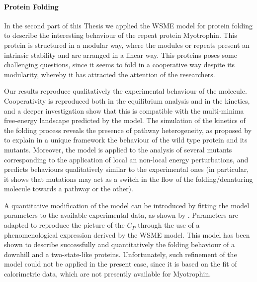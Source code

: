
\paragraph{Protein Folding}
In the second part of this Thesis we applied the WSME model for protein folding to describe the  interesting
behaviour of the repeat protein Myotrophin.
This protein is structured in a modular way, where the modules or repeats
present an intrinsic stability and are arranged in a linear way.
This proteins  poses some challenging questions, since it 
seems to fold in a cooperative way despite its modularity, whereby it has attracted the
attention of the researchers.

Our results reproduce qualitatively the experimental behaviour of the
molecule. Cooperativity is reproduced both in the equilibrium analysis and
in the kinetics, and a deeper investigation show that this is compatible with
the multi-minima free-energy landscape predicted by the model.
The simulation of the kinetics of the folding process reveals the presence of 
pathway heterogeneity, as proposed by \citet{Lowe2007a} to explain in a unique framework
the behaviour of the wild type protein and its mutants.
Moreover, the model is applied to the analysis  of several mutants corresponding to 
the application
of local an non-local energy perturbations, and predicts behaviours
qualitatively similar to the experimental ones (in particular, it shows that mutations may act as a switch in the flow of the folding/denaturing molecule towards a pathway or the other).

A quantitative modification of the model can be introduced by fitting the model
parameters to the available experimental data, as shown by
\citet{Bruscolini2011}.
Parameters are adapted to reproduce the picture of the $C_P$ through the use of
a phenomenological expression derived by the WSME model.
This model has been shown to describe successfully and quantitatively the folding
behaviour of a downhill and a two-state-like proteins\cite{Bruscolini2011}.
Unfortunately, such refinement of the model could not be applied in the present
case, since it is based on the fit of calorimetric data, which are not presently
available for Myotrophin.

